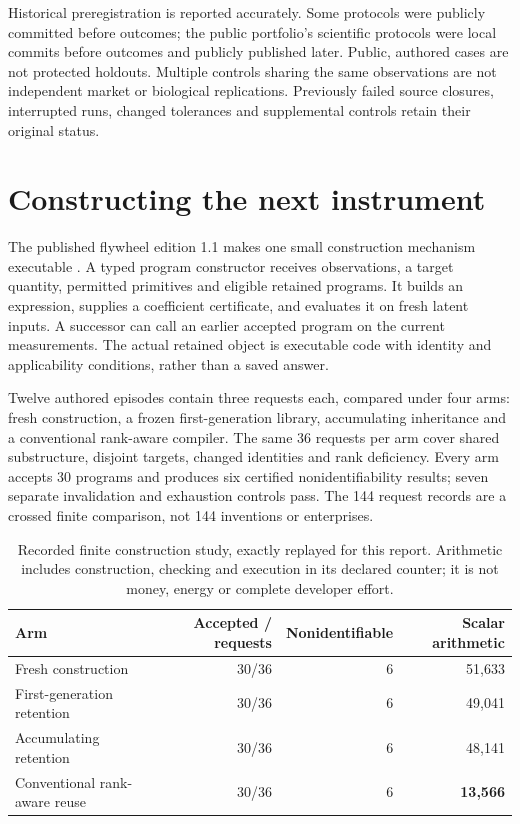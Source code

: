 \documentclass[11pt,letterpaper]{article}
\begin{document}
Historical preregistration is reported accurately. Some protocols were publicly committed before outcomes; the public portfolio's scientific protocols were local commits before outcomes and publicly published later. Public, authored cases are not protected holdouts. Multiple controls sharing the same observations are not independent market or biological replications. Previously failed source closures, interrupted runs, changed tolerances and supplemental controls retain their original status.

\section{Constructing the next instrument}
The published flywheel edition 1.1 makes one small construction mechanism executable \cite{flywheel11}. A typed program constructor receives observations, a target quantity, permitted primitives and eligible retained programs. It builds an expression, supplies a coefficient certificate, and evaluates it on fresh latent inputs. A successor can call an earlier accepted program on the current measurements. The actual retained object is executable code with identity and applicability conditions, rather than a saved answer.

Twelve authored episodes contain three requests each, compared under four arms: fresh construction, a frozen first-generation library, accumulating inheritance and a conventional rank-aware compiler. The same 36 requests per arm cover shared substructure, disjoint targets, changed identities and rank deficiency. Every arm accepts 30 programs and produces six certified nonidentifiability results; seven separate invalidation and exhaustion controls pass. The 144 request records are a crossed finite comparison, not 144 inventions or enterprises.

\begin{table}[htbp]\centering\small
\begin{tabularx}{\linewidth}{@{}Yrrr@{}}\toprule
Arm & Accepted / requests & Nonidentifiable & Scalar arithmetic\\\midrule
Fresh construction & 30/36 & 6 & 51,633\\
First-generation retention & 30/36 & 6 & 49,041\\
Accumulating retention & 30/36 & 6 & 48,141\\
Conventional rank-aware reuse & 30/36 & 6 & \textbf{13,566}\\\bottomrule
\end{tabularx}
\caption{Recorded finite construction study, exactly replayed for this report. Arithmetic includes construction, checking and execution in its declared counter; it is not money, energy or complete developer effort.}\label{tab:foundry}
\end{table}
\end{document}
